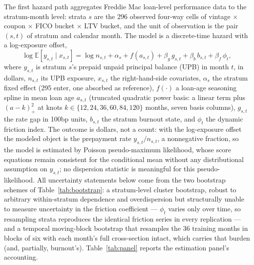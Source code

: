 \documentclass[12pt]{article}
\begin{document}
The first hazard path aggregates Freddie Mac loan-level performance data to the stratum-month level: strata $s$ are the 296 observed four-way cells of vintage $\times$ coupon $\times$ FICO bucket $\times$ LTV bucket, and the unit of observation is the pair $(s,t)$ of stratum and calendar month. The model is a discrete-time hazard with a log-exposure offset,
\begin{equation}\label{eq:pathA}
\log \mathbb{E}\!\left[y_{s,t} \mid x_{s,t}\right] = \log n_{s,t} + \alpha_{s} + f\!\left(a_{s,t}\right) + \beta_g\, g_{s,t} + \beta_b\, b_{s,t} + \beta_f\, \phi_t ,
\end{equation}
where $y_{s,t}$ is stratum $s$'s prepaid unpaid principal balance (UPB) in month $t$, in dollars, $n_{s,t}$ its UPB exposure, $x_{s,t}$ the right-hand-side covariates, $\alpha_{s}$ the stratum fixed effect (295 enter, one absorbed as reference), $f(\cdot)$ a loan-age seasoning spline in mean loan age $a_{s,t}$ (truncated quadratic power basis: a linear term plus $(a - k)_+^2$ at knots $k \in \{12, 24, 36, 60, 84, 120\}$ months, seven basis columns), $g_{s,t}$ the rate gap in 100bp units, $b_{s,t}$ the stratum burnout state, and $\phi_t$ the dynamic friction index. The outcome is dollars, not a count: with the log-exposure offset the modeled object is the prepayment rate $y_{s,t}/n_{s,t}$, a nonnegative fraction, so the model is estimated by Poisson pseudo-maximum likelihood, whose score equations remain consistent for the conditional mean without any distributional assumption on $y_{s,t}$; no dispersion statistic is meaningful for this pseudo-likelihood. All uncertainty statements below come from the two bootstrap schemes of Table~\ref{tab:bootstrap}: a stratum-level cluster bootstrap, robust to arbitrary within-stratum dependence and overdispersion but structurally unable to measure uncertainty in the friction coefficient --- $\phi_t$ varies only over time, so resampling strata reproduces the identical friction series in every replication --- and a temporal moving-block bootstrap that resamples the 36 training months in blocks of six with each month's full cross-section intact, which carries that burden (and, partially, burnout's). Table~\ref{tab:panel} reports the estimation panel's accounting.
\end{document}

